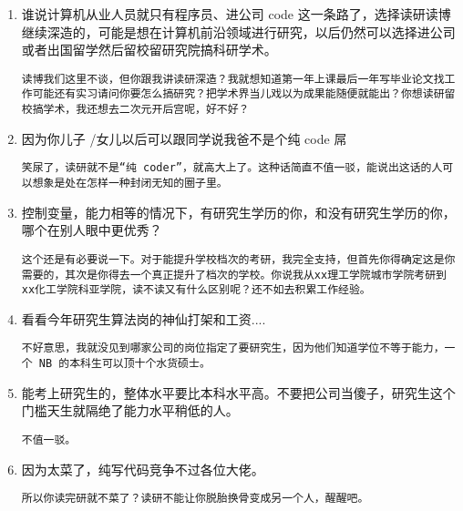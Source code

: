 \documentclass[cn,11pt]{elegantbook}
\begin{document}
\begin{enumerate}
\item 谁说计算机从业人员就只有程序员、进公司 code 这一条路了，选择读研读博继续深造的，可能是想在计算机前沿领域进行研究，以后仍然可以选择进公司或者出国留学然后留校留研究院搞科研学术。	

\begin{lstlisting}
读博我们这里不谈，但你跟我讲读研深造？我就想知道第一年上课最后一年写毕业论文找工作可能还有实习请问你要怎么搞研究？把学术界当儿戏以为成果能随便就能出？你想读研留校搞学术，我还想去二次元开后宫呢，好不好？
\end{lstlisting}

\item 因为你儿子 /女儿以后可以跟同学说我爸不是个纯 code 屌

\begin{lstlisting}
笑尿了，读研就不是“纯 coder”，就高大上了。这种话简直不值一驳，能说出这话的人可以想象是处在怎样一种封闭无知的圈子里。
\end{lstlisting}

\item 控制变量，能力相等的情况下，有研究生学历的你，和没有研究生学历的你，哪个在别人眼中更优秀？

\begin{lstlisting}
这个还是有必要说一下。对于能提升学校档次的考研，我完全支持，但首先你得确定这是你需要的，其次是你得去一个真正提升了档次的学校。你说我从xx理工学院城市学院考研到xx化工学院科亚学院，读不读又有什么区别呢？还不如去积累工作经验。
\end{lstlisting}

\item 看看今年研究生算法岗的神仙打架和工资....

\begin{lstlisting}
不好意思，我就没见到哪家公司的岗位指定了要研究生，因为他们知道学位不等于能力，一个 NB 的本科生可以顶十个水货硕士。
\end{lstlisting}

\item 能考上研究生的，整体水平要比本科水平高。不要把公司当傻子，研究生这个门槛天生就隔绝了能力水平稍低的人。

\begin{lstlisting}
不值一驳。
\end{lstlisting}

\item 因为太菜了，纯写代码竞争不过各位大佬。

\begin{lstlisting}
所以你读完研就不菜了？读研不能让你脱胎换骨变成另一个人，醒醒吧。
\end{lstlisting}


\end{enumerate}
\end{document}
